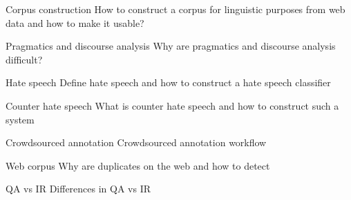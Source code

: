 \documentclass{article}
\begin{document}
\begin{exercise}{Corpus construction}
  How to construct a corpus for linguistic purposes from web data and how to make it usable?

  \begin{solution}
  \end{solution}
\end{exercise}

\begin{exercise}{Pragmatics and discourse analysis}
  Why are pragmatics and discourse analysis difficult?

  \begin{solution}
  \end{solution}
\end{exercise}

\begin{exercise}{Hate speech}
  Define hate speech and how to construct a hate speech classifier

  \begin{solution}
  \end{solution}
\end{exercise}

\begin{exercise}{Counter hate speech}
  What is counter hate speech and how to construct such a system

  \begin{solution}
  \end{solution}
\end{exercise}

\begin{exercise}{Crowdsourced annotation}
  Crowdsourced annotation workflow

  \begin{solution}
  \end{solution}
\end{exercise}

\begin{exercise}{Web corpus}
  Why are duplicates on the web and how to detect

  \begin{solution}
  \end{solution}
\end{exercise}

\begin{exercise}{QA vs IR}
  Differences in QA vs IR

  \begin{solution}
  \end{solution}
\end{exercise}
\end{document}
